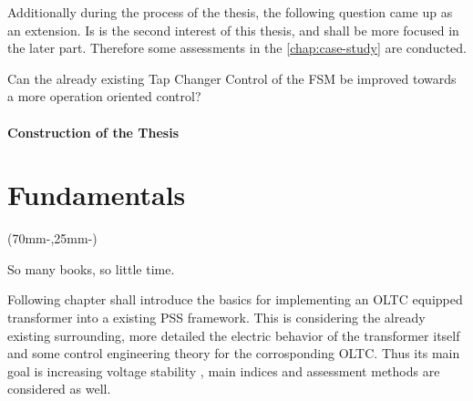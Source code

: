 Additionally during the process of the thesis, the following question came up as an extension. Is is the second interest of this thesis, and shall be more focused in the later part. Therefore some assessments in the \autoref{chap:case-study} are conducted.

\begin{tcolorbox}[float, colback=ees_blue!5!white,colframe=ees_lightblue, toptitle=1mm, bottomtitle=1mm, left=2mm, right=2.5mm, top=2mm, bottom=2mm, title={\textbf{Additional Question of this Thesis}}]
    Can the already existing Tap Changer Control of the \acf{FSM} be improved towards a more operation oriented control?
\end{tcolorbox}

\subsubsection{Construction of the Thesis}


\chapter{Fundamentals}
\label{ch:fundamentals}

\begin{textblock*}{.7\textwidth}(70mm-\offset,25mm-\offset)
    \begin{fquote}
        So many books, so little time.
    \end{fquote}
\end{textblock*}

Following chapter shall introduce the basics for implementing an \acs{OLTC} equipped transformer into a existing \acs{PSS} framework. This is considering the already existing surrounding, more detailed the electric behavior of the transformer itself and some control engineering theory for the corrosponding \acs{OLTC}. Thus its main goal is increasing voltage stability \autocite{machowskiPowerSystemDynamics2020}, main indices and assessment methods are considered as well.

